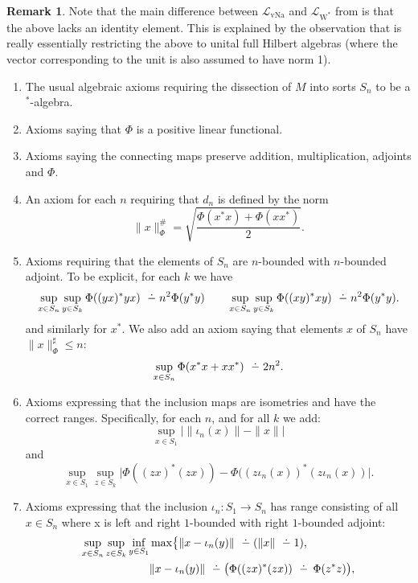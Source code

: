 \documentclass[12pt]{amsart}
\theoremstyle{definition}
\newtheorem{remark}[thm]{Remark}
\newcommand{\dminus}{ 
\buildrel\textstyle\ .\over{\hbox{ 
\vrule height3pt depth0pt width0pt}{\smash-} 
}}
\def\cal{\mathcal}
\newcommand{\wstar}{$\mathrm{W}^*$}
\DeclareMathOperator{\vNa}{vNa}
\begin{document}
\begin{remark}
    Note that the main difference between $\cal L_{\vNa}$ and $\cal L_{\text{\wstar}}$ from \cite{AGHS} is that the above lacks an identity element.  This is explained by the observation that \cite{AGHS} is really essentially restricting the above to unital full Hilbert algebras (where the vector corresponding to the unit is also assumed to have norm 1).
\end{remark}

\begin{enumerate}
    \item The usual algebraic axioms requiring the dissection of $M$ into sorts $S_n$ to be a $^*$-algebra.
    \item Axioms saying that $\Phi$ is a positive linear functional.
    \item Axioms saying the connecting maps preserve addition, multiplication, adjoints and $\Phi$.
    \item An axiom for each $n$ requiring that $d_n$ is defined by the norm
    \[
        \|x\|_\Phi^\# = \sqrt{\frac{\Phi(x^*x)+\Phi(xx^*)}{2}}.
    \]
    \item Axioms requiring that the elements of $S_n$ are $n$-bounded with $n$-bounded adjoint.  To be explicit, for each $k$ we have
    \[
        \sup_{x \in S_n}\sup_{y \in S_k} \Phi((yx)^*yx)\dminus n^2\Phi(y^*y) \qquad \sup_{x \in S_n}\sup_{y \in S_k} \Phi((xy)^*xy)\dminus n^2\Phi(y^*y).
    \]
    and similarly for $x^*$.  We also add an axiom saying that elements $x$ of $S_n$ have $\|x\|_{\Phi}^\sharp \leq n$:
    \[
        \sup_{x \in S_n} \Phi(x^*x + xx^*) \dminus 2n^2.
    \]
    \item Axioms expressing that the inclusion maps are isometries and have the correct ranges.  Specifically, for each $n$, and for all $k$ we add:
    \[
        \sup_{x \in S_1}  \bigl|\|\iota_n(x)\|-\|x\|\bigr|
    \]
    and
    \[
        \sup_{x \in S_1}\sup_{z\in S_k} \bigl|\Phi((zx)^*(zx)) -\Phi((z\iota_n (x))^*(z\iota_n (x))\bigr|.
    \]
    \item Axioms expressing that the inclusion $\iota_n: S_1\to S_n$ has range consisting of all $x\in S_n$ where x is left and right $1$-bounded with right $1$-bounded adjoint:
    \begin{equation*}
        \begin{split}
            \sup_{x \in S_n} \sup_{z \in S_k}\inf_{y \in S_1}&\max\bigl\{\|x - \iota_n(y)\| \dminus (\|x\| \dminus 1),\\
            &\|x - \iota_n(y)\| \dminus \bigl(\Phi((zx)^*(zx)) \dminus \,\Phi(z^*z)\bigr),\\

\end{split}
\end{equation*}
\end{enumerate}
\end{document}
